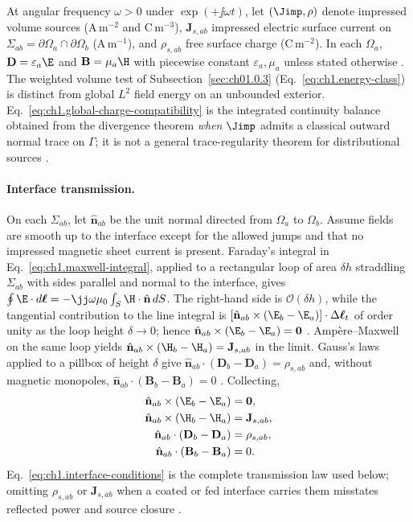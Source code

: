 At angular frequency $\omega>0$ under $\exp(+\jj\omega t)$, let $(\Jimp,\rho)$ denote impressed volume sources (A\,m$^{-2}$ and C\,m$^{-3}$), $\mathbf{J}_{s,ab}$ impressed electric surface current on $\Sigma_{ab}=\partial\Omega_a\cap\partial\Omega_b$ (A\,m$^{-1}$), and $\rho_{s,ab}$ free surface charge (C\,m$^{-2}$). In each $\Omega_a$, $\mathbf{D}=\varepsilon_a\E$ and $\mathbf{B}=\mu_a\H$ with piecewise constant $\varepsilon_a,\mu_a$ unless stated otherwise \cite{stratton1941}. The weighted volume test of Subsection~\ref{sec:ch01.0.3} (Eq.~\eqref{eq:ch1.energy-class}) is distinct from global $L^2$ field energy on an unbounded exterior. Eq.~\eqref{eq:ch1.global-charge-compatibility} is the integrated continuity balance obtained from the divergence theorem \emph{when} $\Jimp$ admits a classical outward normal trace on $\Gamma$; it is not a general trace-regularity theorem for distributional sources \cite{stratton1941}.

\paragraph{Interface transmission.}
On each $\Sigma_{ab}$, let $\hat{\mathbf{n}}_{ab}$ be the unit normal directed from $\Omega_a$ to $\Omega_b$. Assume fields are smooth up to the interface except for the allowed jumps and that no impressed magnetic sheet current is present. Faraday's integral in Eq.~\eqref{eq:ch1.maxwell-integral}, applied to a rectangular loop of area $\delta h$ straddling $\Sigma_{ab}$ with sides parallel and normal to the interface, gives $\oint \E\cdot d\boldsymbol{\ell}=-\jj\omega\mu_0\int_S \H\cdot\hat{\mathbf{n}}\,dS$. The right-hand side is $\mathcal{O}(\delta h)$, while the tangential contribution to the line integral is $[\hat{\mathbf{n}}_{ab}\times(\E_b-\E_a)]\cdot\Delta\boldsymbol{\ell}_t$ of order unity as the loop height $\delta\to 0$; hence $\hat{\mathbf{n}}_{ab}\times(\E_b-\E_a)=\mathbf{0}$ \cite{maxwell1873,jackson1999}. Amp\`ere--Maxwell on the same loop yields $\hat{\mathbf{n}}_{ab}\times(\H_b-\H_a)=\mathbf{J}_{s,ab}$ in the limit. Gauss's laws applied to a pillbox of height $\delta$ give $\hat{\mathbf{n}}_{ab}\cdot(\mathbf{D}_b-\mathbf{D}_a)=\rho_{s,ab}$ and, without magnetic monopoles, $\hat{\mathbf{n}}_{ab}\cdot(\mathbf{B}_b-\mathbf{B}_a)=0$ \cite{stratton1941}. Collecting,
\begin{equation}
\label{eq:ch1.interface-conditions}
\begin{aligned}
\hat{\mathbf{n}}_{ab}\times(\E_b-\E_a)&=\mathbf{0},\\
\hat{\mathbf{n}}_{ab}\times(\H_b-\H_a)&=\mathbf{J}_{s,ab},\\
\hat{\mathbf{n}}_{ab}\cdot(\mathbf{D}_b-\mathbf{D}_a)&=\rho_{s,ab},\\
\hat{\mathbf{n}}_{ab}\cdot(\mathbf{B}_b-\mathbf{B}_a)&=0.
\end{aligned}
\end{equation}
Eq.~\eqref{eq:ch1.interface-conditions} is the complete transmission law used below; omitting $\rho_{s,ab}$ or $\mathbf{J}_{s,ab}$ when a coated or fed interface carries them misstates reflected power and source closure \cite{collin2001,jackson1999}.

